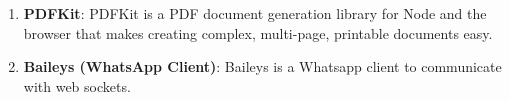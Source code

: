 \begin{enumerate}[label=\roman*.]
  \item \textbf{PDFKit}: PDFKit is a PDF document generation library for Node and the browser that makes creating complex, multi-page, printable documents easy. \cite{PDFKit}
  
  \item \textbf{Baileys (WhatsApp Client)}: Baileys is a Whatsapp client to communicate with web sockets. \cite{Baileys}
  

\end{enumerate}